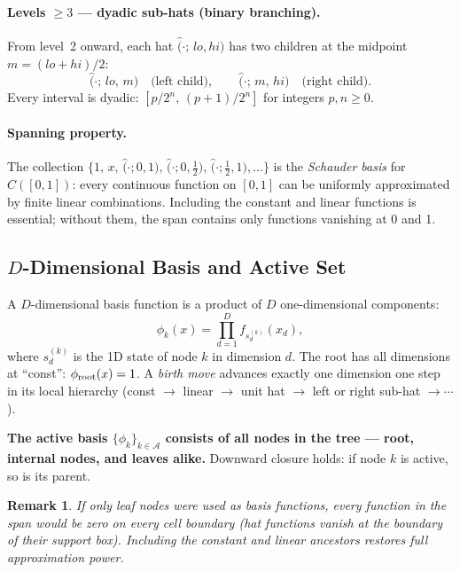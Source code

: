 \documentclass[11pt]{article}
\newtheorem{remark}{Remark}
\begin{document}
\paragraph{Levels $\ge 3$ --- dyadic sub-hats (binary branching).}
From level~2 onward, each hat $\hat(\cdot;\,lo,hi)$ has two children at
the midpoint $m = (lo+hi)/2$:
\begin{equation}
  \hat(\cdot;\,lo,\,m) \quad \text{(left child)}, \qquad
  \hat(\cdot;\,m,\,hi) \quad \text{(right child)}.
  \label{eq:hat-children}
\end{equation}
Every interval is dyadic: $[p/2^n,\,(p+1)/2^n]$ for integers $p,n \ge 0$.

\paragraph{Spanning property.}
The collection $\{1,\, x,\, \hat(\cdot;0,1),\, \hat(\cdot;0,\tfrac12),\,
\hat(\cdot;\tfrac12,1),\ldots\}$ is the \emph{Schauder basis} for $C([0,1])$:
every continuous function on $[0,1]$ can be uniformly approximated by finite
linear combinations.  Including the constant and linear functions is essential;
without them, the span contains only functions vanishing at 0 and 1.

\subsection{$D$-Dimensional Basis and Active Set}
\label{sec:Ddim-basis}

A $D$-dimensional basis function is a product of $D$ one-dimensional
components:
\begin{equation}
  \phi_k(x) = \prod_{d=1}^D f_{s_d^{(k)}}(x_d),
  \label{eq:Ddim-phi}
\end{equation}
where $s_d^{(k)}$ is the 1D state of node $k$ in dimension $d$.
The root has all dimensions at ``const'': $\phi_{\rm root}(x) = 1$.
A \emph{birth move} advances exactly one dimension one step in its local
hierarchy (const $\to$ linear $\to$ unit hat $\to$ left or right sub-hat
$\to \cdots$).

\textbf{The active basis $\{\phi_k\}_{k\in\mathcal{A}}$ consists of all nodes
in the tree --- root, internal nodes, and leaves alike.}
Downward closure holds: if node $k$ is active, so is its parent.

\begin{remark}
If only leaf nodes were used as basis functions, every function in the span
would be zero on every cell boundary (hat functions vanish at the boundary of
their support box).  Including the constant and linear ancestors restores full
approximation power.
\end{remark}
\end{document}
